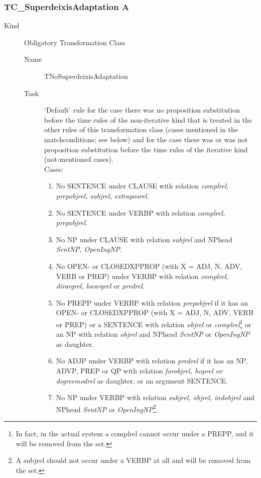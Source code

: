 \subsubsection{TC\_SuperdeixisAdaptation A}
\begin{description}
\item[Kind] Obligatory Transformation Class

\vspace{1 cm}
\begin{description}
\item[Name] TNoSuperdeixisAdaptation
\item[Task] `Default' rule for the case there was no proposition substitution 
before the time rules of the non-iterative kind that is treated in the other 
rules of this transformation
class (cases mentioned in the matchconditions; see below) and for the case 
there was or was not proposition 
substitution before the time rules of the iterative kind (not-mentioned cases).
\\
Cases:
\begin{enumerate}
\item No SENTENCE under CLAUSE with relation {\em complrel, 
      prepobjrel, subjrel, extraposrel}.
\item No SENTENCE under VERBP with relation {\em complrel, prepobjrel}.
\item No NP under CLAUSE with relation {\em subjrel} and NPhead {\em SentNP, 
      OpenIngNP}.
\item No OPEN- or CLOSEDXPPROP (with X = ADJ, N, ADV, VERB or PREP) under 
  VERBP with relation {\em complrel, dirargrel, locargrel\/} or {\em predrel}.
\item No PREPP under VERBP with relation {\em prepobjrel} if it has an OPEN- 
  or CLOSEDXPPROP (with X = ADJ, N, ADV, VERB or PREP) or a SENTENCE with 
  relation {\em objrel} or 
  {\em complrel\/}\footnote{In fact, in the actual system
a complrel cannot occur under a PREPP, and it will be removed from the set.} 
or an NP with relation {\em objrel} 
and NPhead {\em SentNP\/} or {\em OpenIngNP\/} as daughter.
\item No ADJP under VERBP with relation {\em predrel} if it has an NP, ADVP, 
PREP or QP with relation {\em forobjrel, hoprel or degreemodrel} as daughter,  
or an argument SENTENCE.
\item No NP under VERBP with relation {\em subjrel, objrel, indobjrel} and 
NPhead {\em SentNP\/} or {\em OpenIngNP\/}\footnote{A subjrel should 
not occur under a VERBP at all and will be removed from the set.}.
\end{enumerate}


\end{description}
\end{description}
